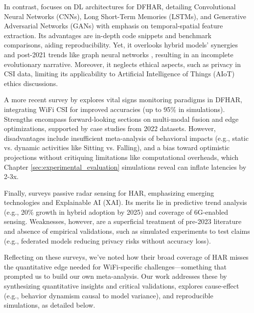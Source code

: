 \documentclass[Afour,sageh,times]{sagej}
\begin{document}
In contrast, \citep{yang2022deep} focuses on DL architectures for DFHAR, detailing Convolutional Neural Networks (CNNs), Long Short-Term Memories (LSTMs), and Generative Adversarial Networks (GANs) with emphasis on temporal-spatial feature extraction. Its advantages are in-depth code snippets and benchmark comparisons, aiding reproducibility. Yet, it overlooks hybrid models' synergies and post-2021 trends like graph neural networks \citep{zhou2022target}, resulting in an incomplete evolutionary narrative. Moreover, it neglects ethical aspects, such as privacy in CSI data, limiting its applicability to Artificial Intelligence of Things (AIoT) ethics discussions.

A more recent survey by \citep{soto2022survey} explores vital signs monitoring paradigms in DFHAR, integrating WiFi CSI for improved accuracies (up to 95\% in simulations). Strengths encompass forward-looking sections on multi-modal fusion and edge optimizations, supported by case studies from 2022 datasets. However, disadvantages include insufficient meta-analysis of behavioral impacts (e.g., static vs. dynamic activities like Sitting vs. Falling), and a bias toward optimistic projections without critiquing limitations like computational overheads, which Chapter \ref{sec:experimental_evaluation} simulations reveal can inflate latencies by 2-3x.

Finally, \citep{savvidou2024passive} surveys passive radar sensing for HAR, emphasizing emerging technologies and Explainable AI (XAI). Its merits lie in predictive trend analysis (e.g., 20\% growth in hybrid adoption by 2025) and coverage of 6G-enabled sensing. Weaknesses, however, are a superficial treatment of pre-2023 literature and absence of empirical validations, such as simulated experiments to test claims (e.g., federated models reducing privacy risks without accuracy loss).

Reflecting on these surveys, we've noted how their broad coverage of HAR misses the quantitative edge needed for WiFi-specific challenges—something that prompted us to build our own meta-analysis. Our work addresses these by synthesizing quantitative insights and critical validations, explores cause-effect (e.g., behavior dynamism causal to model variance), and reproducible simulations, as detailed below. 
\end{document}
